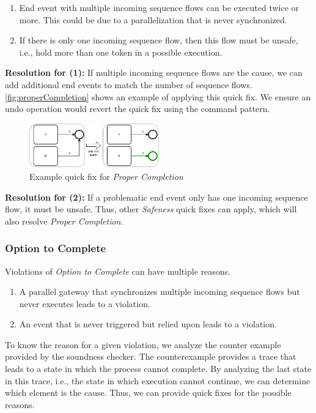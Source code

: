 \documentclass[runningheads]{llncs}
\begin{document}
\begin{enumerate}
	\item End event with multiple incoming sequence flows can be executed twice or more.
	This could be due to a parallelization that is never synchronized.
	\item If there is only one incoming sequence flow, then this flow must be unsafe, i.e., hold more than one token in a possible execution.
\end{enumerate}

\textbf{Resolution for (1):} If multiple incoming sequence flows are the cause, we can add additional end events to match the number of sequence flows.
\autoref{fig:properCompletion} shows an example of applying this quick fix.
We ensure an undo operation would revert the quick fix using the command pattern.

\begin{figure}[ht]
	\centering
	\includegraphics[width=0.5\textwidth]{images/properCompletion}
	\caption{Example quick fix for \textit{Proper Completion}}
	\label{fig:properCompletion}
\end{figure}

\textbf{Resolution for (2):} If a problematic end event only has one incoming sequence flow, it must be unsafe.
Thus, other \textit{Safeness} quick fixes can apply, which will also resolve \textit{Proper Completion}.


\subsubsection{Option to Complete}
Violations of \textit{Option to Complete} can have multiple reasons.

\begin{enumerate}
	\item A parallel gateway that synchronizes multiple incoming sequence flows but never executes leads to a violation.
	\item An event that is never triggered but relied upon leads to a violation.
\end{enumerate}

To know the reason for a given violation, we analyze the counter example provided by the soundness checker.
The counterexample provides a trace that leads to a state in which the process cannot complete.
By analyzing the last state in this trace, i.e., the state in which execution cannot continue, we can determine which element is the cause.
Thus, we can provide quick fixes for the possible reasons.
\end{document}
